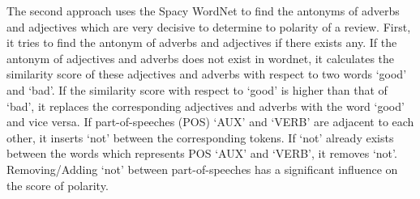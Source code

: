 \documentclass[11pt,a4paper]{article}
\begin{document}
The second approach uses the Spacy WordNet \cite{miller1995wordnet} \cite{miller1998wordnet} to find the antonyms of adverbs and adjectives which are very decisive to determine to polarity of a review. First, it tries to find the antonym of adverbs and adjectives if there exists any. If the antonym of adjectives and adverbs does not exist in wordnet, it calculates the similarity score of these adjectives and adverbs with respect to two words ‘good’ and ‘bad’. If the similarity score with respect to ‘good’ is higher than that of ‘bad’, it replaces the corresponding adjectives and adverbs with the word ‘good’ and vice versa.
If part-of-speeches (POS) ‘AUX’ and ‘VERB’ are adjacent to each other, it inserts ‘not’ between the corresponding tokens. If ‘not’ already exists between the words which represents POS ‘AUX’ and ‘VERB’, it removes ‘not’. Removing/Adding ‘not’ between part-of-speeches has a significant influence on the score of polarity.\\
\end{document}
